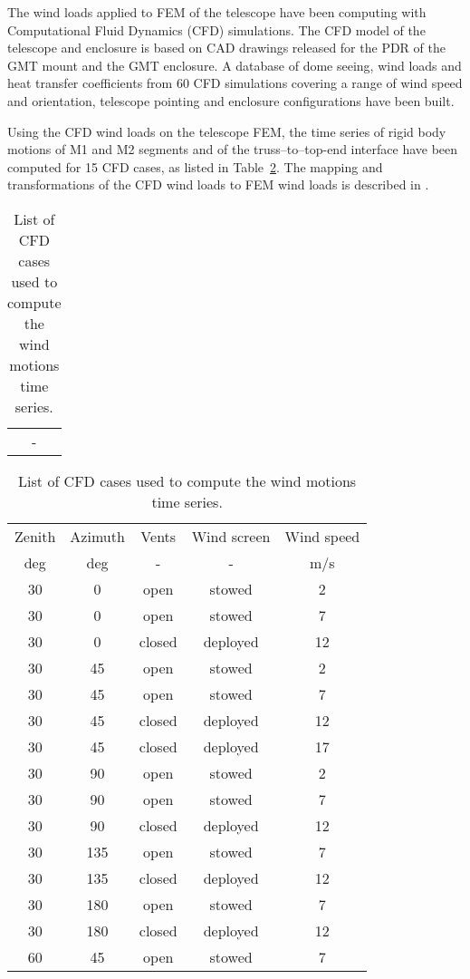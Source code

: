 The wind loads applied to FEM of the telescope have been computing with
Computational Fluid Dynamics (CFD) simulations.
The CFD model\cite{GMT.DOC.05211} of the telescope and enclosure is based on CAD drawings released
for the PDR of the GMT mount and the GMT enclosure.
A database of dome seeing, wind loads and heat transfer coefficients from 60 CFD
simulations covering a range of wind speed and orientation,
telescope pointing and enclosure configurations have been
built\cite{GMT.DOC.05214}.

Using the CFD wind loads on the telescope FEM,
the time series of rigid body motions of M1 and M2 segments and of the
truss--to--top-end interface have been computed for 15 CFD cases, as listed in
Table~\ref{tab:cfd-cases}.
The mapping and transformations of the CFD wind loads to FEM wind loads is
described in \cite{GMT.DOC.05506}.

\begin{table}
  \centering
  \begin{tabular}{c}
    -
  \end{tabular}
  \begin{tabular}{ccccc}\toprule
    Zenith & Azimuth & Vents  & Wind screen & Wind speed \\
    deg & deg & - & - & m/s \\\midrule
    30     & 0       & open & stowed & 2 \\ 
    30     & 0       & open & stowed & 7 \\ 
    30     & 0       & closed & deployed & 12 \\ 
    30     & 45       & open & stowed & 2 \\ 
    30     & 45       & open & stowed & 7 \\ 
    30     & 45       & closed & deployed & 12 \\ 
    30     & 45       & closed & deployed & 17 \\ 
    30     & 90       & open & stowed & 2 \\ 
    30     & 90       & open & stowed & 7 \\ 
    30     & 90       & closed & deployed & 12 \\ 
    30     & 135       & open & stowed & 7 \\ 
    30     & 135       & closed & deployed & 12 \\ 
    30     & 180       & open & stowed & 7 \\ 
    30     & 180       & closed & deployed & 12 \\ 
    60     & 45       & open & stowed & 7 \\ \bottomrule
  \end{tabular}
  \label{tab:cfd-cases}
  \caption{List of CFD cases used to compute the wind motions time series.}
\end{table}




